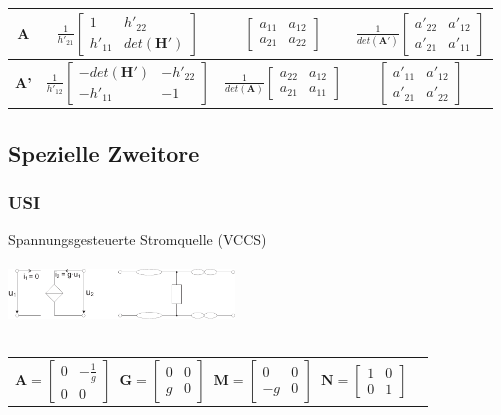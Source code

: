 \documentclass[a4paper,twocolumn,10pt]{article}
\begin{document}
{\begin{tabular}{@{}|@{}c@{}|@{}c@{}|@{}c@{}|@{}c@{}|}
\hline \textbf{A} & $\frac{1}{h'_{21}}\begin{bmatrix}1 & h'_{22}\\ h'_{11} & det(\textbf{H}')\end{bmatrix}$ & $\begin{bmatrix}a_{11} & a_{12}\\ a_{21} & a_{22}\end{bmatrix}$ & $\frac{1}{det(\textbf{A}')}\begin{bmatrix}a'_{22} & a'_{12}\\ a'_{21} & a'_{11}\end{bmatrix}$\\
\hline \textbf{A'} & $\frac{1}{h'_{12}}\begin{bmatrix}-det(\textbf{H}') & -h'_{22}\\ -h'_{11} & -1\end{bmatrix}$ & $\frac{1}{det(\textbf{A})}\begin{bmatrix}a_{22} & a_{12}\\ a_{21} & a_{11}\end{bmatrix}$ & $\begin{bmatrix}a'_{11} & a'_{12}\\ a'_{21} & a'_{22}\end{bmatrix}$\\
\hline 
\end{tabular}}

\subsection*{Spezielle Zweitore}
\subsubsection*{USI}
Spannungsgesteuerte Stromquelle (VCCS)\\\\
\includegraphics[width=0.45\textwidth]{Grafiken/OP_USI}\\\\
\begin{tabular}{ll}
$\textbf{A}=\begin{bmatrix}0 & -\frac{1}{g}\\ 0 & 0\end{bmatrix}\;\;\textbf{G}=\begin{bmatrix}0 & 0\\ g & 0\end{bmatrix}\;\;\textbf{M}=\begin{bmatrix}0 & 0\\ -g & 0\end{bmatrix}\;\;\textbf{N}=\begin{bmatrix}1 & 0\\ 0 & 1\end{bmatrix}$
\end{tabular}
\end{document}

